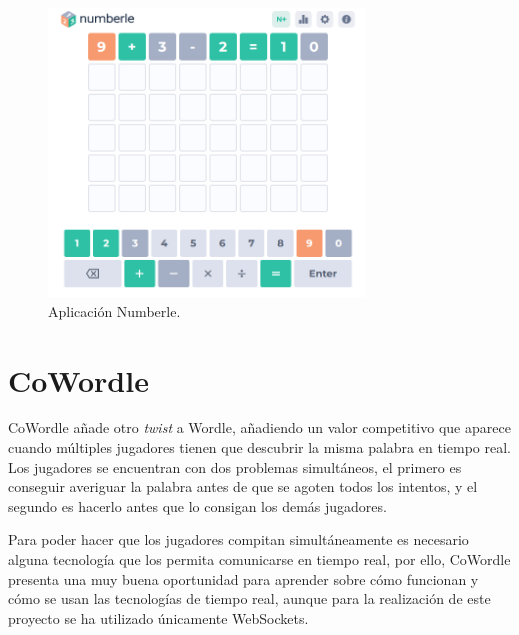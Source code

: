 \begin{figure}
	\centering
	\includegraphics[clip=true,width=0.75\textwidth]{images/numberle.png}
	\caption{Aplicación Numberle.}
	\label{fig:numberle_app}
\end{figure}



\section{CoWordle}

CoWordle añade otro \textit{twist} a Wordle, añadiendo un valor competitivo que aparece cuando múltiples jugadores tienen que descubrir la misma palabra en tiempo real. Los jugadores se encuentran con dos problemas simultáneos, el primero es conseguir averiguar la palabra antes de que se agoten todos los intentos, y el segundo es hacerlo antes que lo consigan los demás jugadores.

Para poder hacer que los jugadores compitan simultáneamente es necesario alguna tecnología que los permita comunicarse en tiempo real, por ello, CoWordle presenta una muy buena oportunidad para aprender sobre cómo funcionan y cómo se usan las tecnologías de tiempo real, aunque para la realización de este proyecto se ha utilizado únicamente WebSockets.
